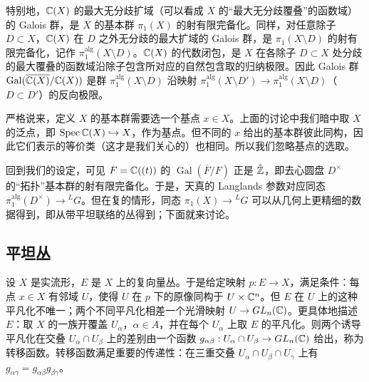 特别地，$\mathbb{C}(X)$ 的最大无分歧扩域（可以看成 $X$ 的“最大无分歧覆叠”的函数域）的 Galois 群，是 $X$ 的基本群 $\pi_1(X)$ 的射有限完备化。同样，对任意除子 $D\subset X$，$\mathbb{C}(X)$ 在 $D$ 之外无分歧的最大扩域的 Galois 群，是 $\pi_1(X\setminus D)$ 的射有限完备化，记作 $\pi_1^{\mathrm{alg}}(X\setminus D)$。$\mathbb{C}(X)$ 的代数闭包，是 $X$ 在各除子 $D\subset X$ 处分歧的最大覆叠的函数域沿除子包含所对应的自然包含取的归纳极限。因此 Galois 群 $\operatorname{Gal}(\overline{\mathbb{C}(X)}/\mathbb{C}(X))$ 是群 $\pi_1^{\mathrm{alg}}(X\setminus D)$ 沿映射 $\pi_1^{\mathrm{alg}}(X\setminus D')\to\pi_1^{\mathrm{alg}}(X\setminus D)$（$D\subset D'$）的反向极限。

严格说来，定义 $X$ 的基本群需要选一个基点 $x\in X$。上面的讨论中我们暗中取 $X$ 的泛点，即 $\operatorname{Spec}\mathbb{C}(X)\hookrightarrow X$，作为基点。但不同的 $x$ 给出的基本群彼此同构，因此它们表示的等价类（这才是我们关心的）也相同。所以我们忽略基点的选取。

回到我们的设定，可见 $F=\mathbb{C}((t))$ 的 $\operatorname{Gal}(\overline F/F)$ 正是 $\hat{\mathbb{Z}}$，即去心圆盘 $D^\times$ 的“拓扑”基本群的射有限完备化。于是，天真的 Langlands 参数对应同态 $\pi_1^{\mathrm{alg}}(D^\times)\to{}^L G$。但在复的情形，同态 $\pi_1(X)\to{}^L G$ 可以从几何上更精细的数据得到，即从带平坦联络的丛得到；下面就来讨论。

\subsection{平坦丛}

设 $X$ 是实流形，$E$ 是 $X$ 上的复向量丛。于是给定映射 $p:E\to X$，满足条件：每点 $x\in X$ 有邻域 $U$，使得 $U$ 在 $p$ 下的原像同构于 $U\times\mathbb{C}^n$。但 $E$ 在 $U$ 上的这种平凡化不唯一；两个不同平凡化相差一个光滑映射 $U\to GL_n(\mathbb{C})$。更具体地描述 $E$：取 $X$ 的一族开覆盖 $U_\alpha$，$\alpha\in A$，并在每个 $U_\alpha$ 上取 $E$ 的平凡化。则两个诱导平凡化在交叠 $U_\alpha\cap U_\beta$ 上的差别由一个函数 $g_{\alpha\beta}:U_\alpha\cap U_\beta\to GL_n(\mathbb{C})$ 给出，称为转移函数。转移函数满足重要的传递性：在三重交叠 $U_\alpha\cap U_\beta\cap U_\gamma$ 上有 $g_{\alpha\gamma}=g_{\alpha\beta}g_{\beta\gamma}$。

